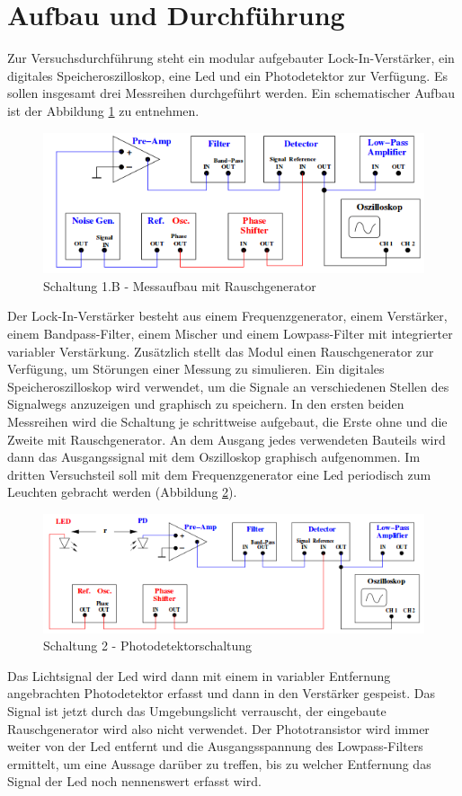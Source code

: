 \documentclass[11pt]{article}
\begin{document}
\section{Aufbau und Durchf\"{u}hrung}
Zur Versuchsdurchführung steht ein modular aufgebauter Lock-In-Verstärker, ein digitales Speicheroszilloskop, eine Led und ein Photodetektor zur Verfügung. Es sollen insgesamt drei Messreihen durchgeführt werden.
Ein schematischer Aufbau ist der Abbildung \ref{Abbi2} zu entnehmen.\begin{figure}[h]
\centering
\includegraphics[scale=0.70]{Bilder/Abbildung2.png}
\caption{Schaltung 1.B - Messaufbau mit Rauschgenerator}
\label{Abbi2}
\end{figure}
Der Lock-In-Verstärker besteht aus einem Frequenzgenerator, einem Verstärker, einem Bandpass-Filter, einem Mischer und einem Lowpass-Filter mit integrierter variabler Verstärkung. Zusätzlich stellt das Modul einen Rauschgenerator zur Verfügung, um Störungen einer Messung zu simulieren. Ein digitales Speicheroszilloskop wird verwendet, um die Signale an verschiedenen Stellen des Signalwegs anzuzeigen und graphisch zu speichern. In den ersten beiden Messreihen wird die Schaltung je schrittweise aufgebaut, die Erste ohne und die Zweite mit Rauschgenerator. An dem Ausgang jedes verwendeten Bauteils wird dann das Ausgangssignal mit dem Oszilloskop graphisch aufgenommen.\newline
Im dritten Versuchsteil soll mit dem Frequenzgenerator eine Led periodisch zum Leuchten gebracht werden (Abbildung \ref{Abbi3}). \begin{figure}[h]
\centering
\includegraphics[scale=0.70]{Bilder/abbildung3.png}
\caption{Schaltung 2 - Photodetektorschaltung}
\label{Abbi3}
\end{figure}
Das Lichtsignal der Led wird dann mit einem in variabler Entfernung angebrachten Photodetektor erfasst und dann in den Verstärker gespeist. Das Signal ist jetzt durch das Umgebungslicht verrauscht, der eingebaute Rauschgenerator wird also nicht verwendet. Der Phototransistor wird immer weiter von der Led entfernt und die Ausgangsspannung des Lowpass-Filters ermittelt, um eine Aussage darüber zu treffen, bis zu welcher Entfernung das Signal der Led noch nennenswert erfasst wird.
\end{document}
